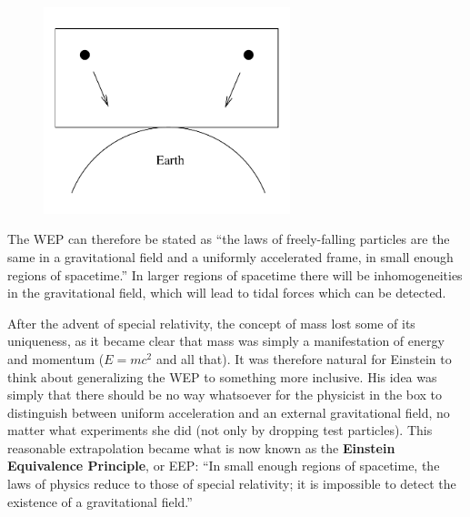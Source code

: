 \documentclass[12pt]{article}
\begin{document}
\eject

\begin{figure}
  \centerline{
  \includegraphics[height=6cm]{pdf/four2}}
\end{figure}

\noindent The WEP can therefore be stated as ``the laws of freely-falling
particles are the same in a gravitational field and a uniformly
accelerated frame, in small enough regions of spacetime.''  In larger
regions of spacetime there will be inhomogeneities in the gravitational
field, which will lead to tidal forces which can be detected.

After the advent of special relativity, the concept of mass lost
some of its uniqueness, as it became clear that mass was simply a
manifestation of energy and momentum ($E=mc^2$ and all that).  It
was therefore natural for Einstein to think about generalizing the
WEP to something more inclusive.  His idea was simply that there
should be no way whatsoever for the physicist in the box to distinguish
between uniform acceleration and an external gravitational field, no
matter what experiments she did (not only by dropping test particles).
This reasonable extrapolation became what is now known as the 
{\bf Einstein Equivalence Principle}, or EEP: ``In small enough
regions of spacetime, the laws of physics reduce to those of special
relativity; it is impossible to detect the existence of a gravitational
field.''
\end{document}
